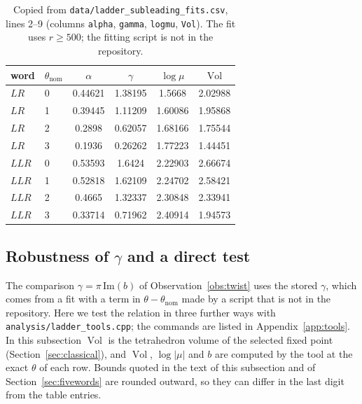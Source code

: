 \documentclass[11pt]{amsart}
\theoremstyle{definition}
\theoremstyle{remark}
\newcommand{\Vol}{\operatorname{Vol}}
\begin{document}
\begin{table}[ht]
\centering
\begin{tabular}{llcccc}
\toprule
word & $\theta_{\mathrm{nom}}$ & $\alpha$ & $\gamma$ & $\log\mu$ & $\Vol$ \\
\midrule
$LR$  & 0 & 0.44621 & 1.38195 & 1.5668  & 2.02988 \\
$LR$  & 1 & 0.39445 & 1.11209 & 1.60086 & 1.95868 \\
$LR$  & 2 & 0.2898  & 0.62057 & 1.68166 & 1.75544 \\
$LR$  & 3 & 0.1936  & 0.26262 & 1.77223 & 1.44451 \\
$LLR$ & 0 & 0.53593 & 1.6424  & 2.22903 & 2.66674 \\
$LLR$ & 1 & 0.52818 & 1.62109 & 2.24702 & 2.58421 \\
$LLR$ & 2 & 0.4665  & 1.32337 & 2.30848 & 2.33941 \\
$LLR$ & 3 & 0.33714 & 0.71962 & 2.40914 & 1.94573 \\
\bottomrule
\end{tabular}
\caption{Copied from \texttt{data/ladder\_subleading\_fits.csv}, lines 2--9 (columns
\texttt{alpha}, \texttt{gamma}, \texttt{logmu}, \texttt{Vol}). The fit uses
$r \ge 500$; the fitting script is not in the repository.}
\label{tab:fits}
\end{table}

\subsection{Robustness of $\gamma$ and a direct test}\label{sec:robust}
The comparison $\gamma = \pi\,\mathrm{Im}(b)$ of Observation~\ref{obs:twist} uses the
stored $\gamma$, which comes from a fit with a term in $\theta - \theta_{\mathrm{nom}}$
made by a script that is not in the repository. Here we test the relation in three
further ways with \texttt{analysis/ladder\_tools.cpp}; the commands are listed in
Appendix~\ref{app:tools}. In this subsection $\Vol$ is the tetrahedron volume of the
selected fixed point (Section~\ref{sec:classical}), and $\Vol$, $\log|\mu|$ and $b$ are
computed by the tool at the exact $\theta$ of each row. Bounds quoted in the text of
this subsection and of Section~\ref{sec:fivewords} are rounded outward, so they can
differ in the last digit from the table entries.
\end{document}
